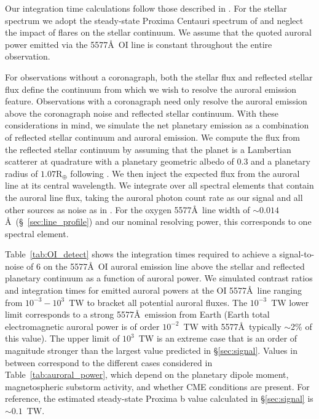 \documentclass{emulateapj}
\begin{document}
Our integration time calculations follow those described in \citet{Robinson2016}. For the stellar spectrum we adopt the steady-state Proxima Centauri spectrum of \citet{Meadows2016} and neglect the impact of flares on the stellar continuum. We assume that the quoted auroral power emitted via the 5577\AA\ OI line is constant throughout the entire observation.

For observations without a coronagraph, both the stellar flux and reflected stellar flux define the continuum from which we wish to resolve the auroral emission feature. Observations with a coronagraph need only resolve the auroral emission above the coronagraph noise and reflected stellar continuum.  With these considerations in mind, we simulate the net planetary emission as a combination of reflected stellar continuum and auroral emission.  We compute the flux from the reflected stellar continuum by assuming that the planet is a Lambertian scatterer at quadrature with a planetary geometric albedo of 0.3 and a planetary radius of $1.07\mathrm{R}_{\oplus}$  following \citet{Barnes2016}.  We then inject the expected flux from the auroral line at its central wavelength.  We integrate over all spectral elements that contain the auroral line flux, taking the auroral photon count rate as our signal and all other sources as noise as in \citet{Robinson2016}.  For the oxygen 5577\AA\ line width of ${\sim} 0.014$\AA\ (\S~\ref{sec:line_profile}) and our nominal resolving power, this corresponds to one spectral element.

Table~\ref{tab:OI_detect} shows the integration times required to achieve a signal-to-noise of 6 on the 5577\AA\ OI auroral emission line above the stellar and reflected planetary continuum as a function of auroral power.  We simulated contrast ratios and integration times for emitted auroral powers at the OI 5577\AA\ line ranging from $10^{-3} - 10^{3}$~TW to bracket all potential auroral fluxes. The $10^{-3}$~TW lower limit corresponds to a strong 5577\AA\ emission from Earth (Earth total electromagnetic auroral power is of order $10^{-2}$~TW with 5577\AA\ typically $\sim$2\% of this value). The upper limit of $10^{3}$~TW is an extreme case that is an order of magnitude stronger than the largest value predicted in \S\ref{sec:signal}. Values in between correspond to the different cases considered in Table~\ref{tab:auroral_power}, which depend on the planetary dipole moment, magnetospheric substorm activity, and whether CME conditions are present. For reference, the estimated steady-state Proxima b value calculated in \S\ref{sec:signal} is ${\sim}0.1$~TW.
\end{document}
